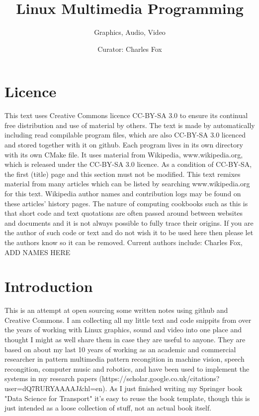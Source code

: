 \documentclass[oneside,english]{scrbook}
\begin{document}
\title{Linux Multimedia Programming}
\author{Graphics, Audio, Video}
\date{Curator: Charles Fox}
\publishers{Licence: CC-BY-SA 3.0}
\maketitle

\chapter*{Licence}

This text uses Creative Commons licence CC-BY-SA 3.0 to ensure its continual free distribution and use of material by others. The text is made by automatically including read compilable program files, which are also CC-BY-SA 3.0 licenced and stored together with it on github. Each program lives in its own directory with its own CMake file.  It uses material from Wikipedia, www.wikipedia.org, which is released under the CC-BY-SA 3.0 licence. As a condition of CC-BY-SA, the first (title) page and this section must not be modified.  This text remixes material from many articles which can be listed by searching www.wikipedia.org for this text.  Wikipedia author names and contribution logs may be found on these articles' history pages.   The nature of computing cookbooks such as this is that short code and text quotations are often passed around between websites and documents and it is not always possible to fully trace their origins. If you are the author of such code or text and do not wish it to be used here then please let the authors know so it can be removed. 
Current authors include: Charles Fox, ADD NAMES HERE

\tableofcontents

\chapter{Introduction}

This is an attempt at open sourcing some written notes using github and Creative Commons. I am collecting all my little text and code snippits from over the years of working with Linux graphics, sound and video into one place and thought I might as well share them in case they are useful to anyone. They are based on about my last 10 years of working as an academic and commercial researcher in pattern multimedia pattern recongition in machine vision, speech recongition, computer music and robotics, and have been used to implement the systems in my research papers (https://scholar.google.co.uk/citations?user=dQ7RURYAAAAJ&hl=en). As I just finished writing my Springer book "Data Science for Transport" it's easy to reuse the book template, though this is just intended as a loose collection of stuff, not an actual book itself.
\end{document}
